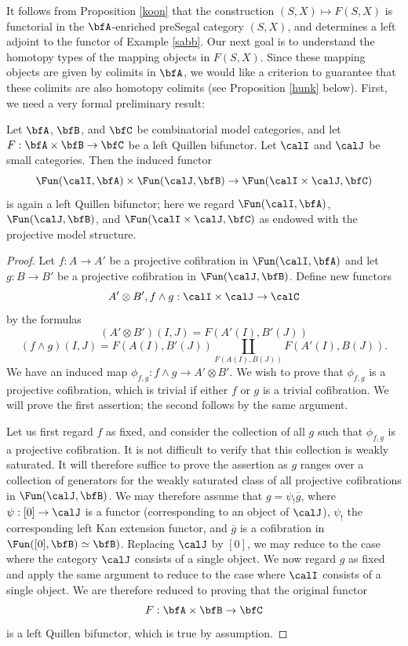 It follows from Proposition \ref{koon} that the construction $(S,X) \mapsto F(S,X)$ is functorial in
the $\bfA$-enriched preSegal category $(S,X)$, and determines a left adjoint to the functor of Example \ref{sabb}. Our next goal is to understand the homotopy types of the mapping objects in
$F(S,X)$. Since these mapping objects are given by colimits in $\bfA$, we would like a criterion
to guarantee that these colimits are also homotopy colimits (see Proposition \ref{hunk} below). First, we need a very formal preliminary result:

\begin{lemma}\label{quen}
Let $\bfA$, $\bfB$, and $\bfC$ be combinatorial model categories, and let
$F: \bfA \times \bfB \rightarrow \bfC$ be a left Quillen bifunctor.
Let $\calI$ and $\calJ$ be small categories. Then the induced functor
$$ \Fun(\calI, \bfA) \times \Fun( \calJ, \bfB) \rightarrow \Fun( \calI \times \calJ, \bfC)$$
is again a left Quillen bifunctor; here we regard $\Fun( \calI, \bfA)$, 
$\Fun(\calJ, \bfB)$, and $\Fun( \calI \times \calJ, \bfC)$ as endowed with the projective model structure.
\end{lemma}

\begin{proof}
Let $f: A \rightarrow A'$ be a projective cofibration in $\Fun( \calI, \bfA)$ and let
$g: B \rightarrow B'$ be a projective cofibration in $\Fun( \calJ, \bfB)$. Define new functors
$$A' \otimes B', f \wedge g: \calI \times \calJ \rightarrow \calC$$
by the formulas
$$ (A' \otimes B')(I,J) = F( A'(I), B'(J) )$$
$$ (f \wedge g)(I,J) = F( A(I), B'(J) ) \coprod_{ F( A(I), B(J) )} F( A'(I), B(J) ).$$
We have an induced map $\phi_{f,g}: f \wedge g \rightarrow A' \otimes B'$. We wish to prove that
$\phi_{f,g}$ is a projective cofibration, which is trivial if either $f$ or $g$ is a trivial cofibration.
We will prove the first assertion; the second follows by the same argument.

Let us first regard $f$ as fixed, and consider the collection of all $g$ such that $\phi_{f,g}$ is a 
projective cofibration. It is not difficult to verify that this collection is weakly saturated. It will therefore
suffice to prove the assertion as $g$ ranges over a collection of generators for the weakly saturated class of all projective cofibrations in $\Fun( \calJ, \bfB)$. We may therefore assume that
$g = \psi_{!} \overline{g}$, where $\psi: [0] \rightarrow \calJ$ is a functor (corresponding to an object of $\calJ$), $\psi_{!}$ the corresponding left Kan extension functor, and $\overline{g}$ is a cofibration
in $\Fun( [0], \bfB) \simeq \bfB)$. Replacing $\calJ$ by $[0]$, we may reduce to the case where
the category $\calJ$ consists of a single object. We now regard $g$ as fixed and apply the same argument to reduce to the case where $\calI$ consists of a single object. We are therefore reduced to proving that the original functor
$$F: \bfA \times \bfB \rightarrow \bfC$$
is a left Quillen bifunctor, which is true by assumption.
\end{proof}

